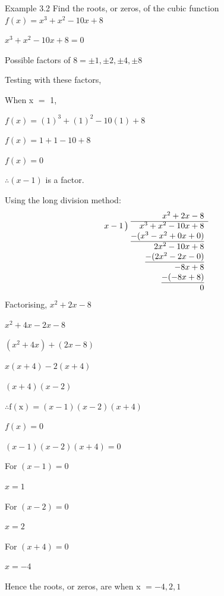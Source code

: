 \begin{example}{Example 3.2}
Find the roots, or zeros, of the cubic function $f(x) = x^3 + x^2 - 10x + 8$

\solution
$x^3 + x^2 - 10x + 8 = 0$

Possible factors of $8 = \pm 1, \pm 2, \pm 4, \pm 8$

Testing with these factors,

When x $=$ 1,

$f(x) = (1)^3 + (1)^2 - 10(1) + 8$

$f(x) = 1 + 1 - 10 + 8$

$f(x) = 0$

$\therefore (x - 1)$ is a factor.

Using the long division method:
\[
\begin{array}{r@{\;}r}
 & x^2 + 2x - 8 \\ \cline{2-2}
x - 1\,\big) & x^3 + x^2 - 10x + 8 \\
 & \underline{-(x^3 - x^2 + 0x + 0)} \\
 & 2x^2 - 10x + 8 \\
 & \underline{-(2x^2 - 2x - 0)} \\
 & -8x + 8 \\
 & \underline{-(-8x + 8)} \\
 & 0
\end{array}
\]
Factorising, $x^2 + 2x - 8$

$x^2 + 4x - 2x - 8$

$(x^2 + 4x) + (2x - 8)$

$x(x + 4) - 2(x + 4)$

$(x + 4)(x - 2)$

$\therefore \mathrm{f}(\mathrm{x}) = (x - 1)(x - 2)(x + 4)$

$f(x) = 0$

$(x - 1)(x - 2)(x + 4) = 0$

For $(x - 1) = 0$

$x = 1$

For $(x - 2) = 0$

$x = 2$

For $(x + 4) = 0$

$x = -4$

Hence the roots, or zeros, are when x $= -4, 2, 1$
\end{example}

